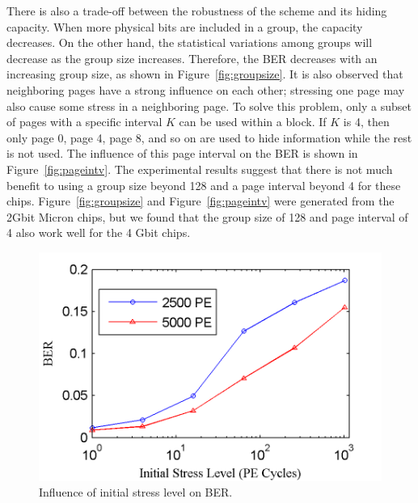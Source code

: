 There is also a trade-off between the robustness of the scheme 
and its hiding capacity. When more physical bits are included 
in a group, the capacity decreases. On the other hand, the 
statistical variations among groups will decrease as the group size
increases. Therefore, the BER decreases with an increasing 
group size, as shown in Figure~\ref{fig:groupsize}.  
It is also observed that neighboring pages have a strong influence 
on each other; stressing one page may also cause some stress in a 
neighboring page. To solve this problem, only a subset of pages with
a specific interval $K$ can be used within a block. If $K$ is 4, then only
page 0, page 4, page 8, and so on are used to hide information while
the rest is not used. The influence of this page interval on the BER 
is shown in Figure~\ref{fig:pageintv}. The experimental results suggest
that there is not much benefit to using a group size beyond 128 and a 
page interval beyond 4 for these chips. Figure~\ref{fig:groupsize}
and Figure~\ref{fig:pageintv} were generated from the 2Gbit Micron 
chips, but we found that the group size of 128 and page interval 
of 4 also work well for the 4 Gbit chips.

\begin{figure} 
\begin{center} 
\includegraphics[width=\mywidth]{figs/initialstess.png} 
\caption{Influence of initial stress level on BER.}
\label{fig:initial_stress} 
\vspace{-0.1in}

\end{center} 
\end{figure}

